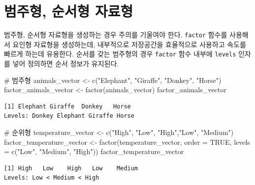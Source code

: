 \documentclass[
  letterpaper,
  chapter,a4paper,showtrims,openright,hidelinks]{oblivoir}
\newenvironment{Shaded}{\begin{snugshade}}{\end{snugshade}}
\newcommand{\AttributeTok}[1]{\textcolor[rgb]{0.40,0.45,0.13}{#1}}
\newcommand{\CommentTok}[1]{\textcolor[rgb]{0.37,0.37,0.37}{#1}}
\newcommand{\ConstantTok}[1]{\textcolor[rgb]{0.56,0.35,0.01}{#1}}
\newcommand{\FunctionTok}[1]{\textcolor[rgb]{0.28,0.35,0.67}{#1}}
\newcommand{\NormalTok}[1]{\textcolor[rgb]{0.00,0.23,0.31}{#1}}
\newcommand{\OtherTok}[1]{\textcolor[rgb]{0.00,0.23,0.31}{#1}}
\newcommand{\StringTok}[1]{\textcolor[rgb]{0.13,0.47,0.30}{#1}}
\begin{document}
\hypertarget{data-type-factor}{%
\section{범주형, 순서형 자료형}\label{data-type-factor}}

범주형, 순서형 자료형을 생성하는 경우 주의를 기울여야 한다.
\texttt{factor} 함수를 사용해서 요인형 자료형을 생성하는데, 내부적으로
저장공간을 효율적으로 사용하고 속도를 빠르게 하는데 유용한다. 순서를
갖는 범주형의 경우 \texttt{factor} 함수 내부에 \texttt{levels} 인자를
넣어 정의하면 순서 정보가 유지된다.

\begin{Shaded}
\begin{Highlighting}[]
\CommentTok{\# 범주형}
\NormalTok{animals\_vector }\OtherTok{\textless{}{-}} \FunctionTok{c}\NormalTok{(}\StringTok{"Elephant"}\NormalTok{, }\StringTok{"Giraffe"}\NormalTok{, }\StringTok{"Donkey"}\NormalTok{, }\StringTok{"Horse"}\NormalTok{)}
\NormalTok{factor\_animals\_vector }\OtherTok{\textless{}{-}} \FunctionTok{factor}\NormalTok{(animals\_vector)}
\NormalTok{factor\_animals\_vector}
\end{Highlighting}
\end{Shaded}

\begin{verbatim}
[1] Elephant Giraffe  Donkey   Horse   
Levels: Donkey Elephant Giraffe Horse
\end{verbatim}

\begin{Shaded}
\begin{Highlighting}[]
\CommentTok{\# 순위형}
\NormalTok{temperature\_vector }\OtherTok{\textless{}{-}} \FunctionTok{c}\NormalTok{(}\StringTok{"High"}\NormalTok{, }\StringTok{"Low"}\NormalTok{, }\StringTok{"High"}\NormalTok{,}\StringTok{"Low"}\NormalTok{, }\StringTok{"Medium"}\NormalTok{)}
\NormalTok{factor\_temperature\_vector }\OtherTok{\textless{}{-}} \FunctionTok{factor}\NormalTok{(temperature\_vector, }\AttributeTok{order =} \ConstantTok{TRUE}\NormalTok{, }\AttributeTok{levels =} \FunctionTok{c}\NormalTok{(}\StringTok{"Low"}\NormalTok{, }\StringTok{"Medium"}\NormalTok{, }\StringTok{"High"}\NormalTok{))}
\NormalTok{factor\_temperature\_vector}
\end{Highlighting}
\end{Shaded}

\begin{verbatim}
[1] High   Low    High   Low    Medium
Levels: Low < Medium < High
\end{verbatim}
\end{document}
